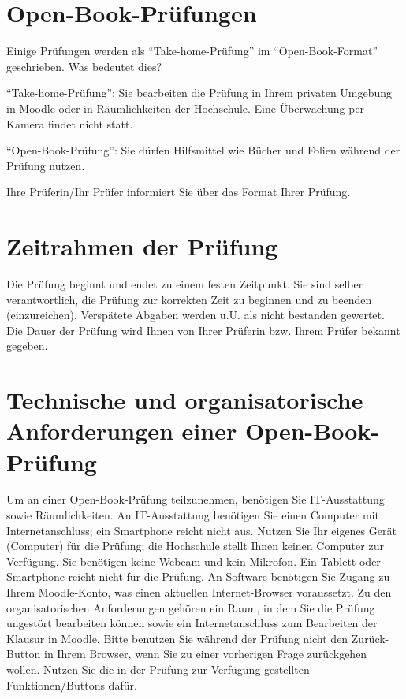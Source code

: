 \documentclass[
  a4paper,
  DIV=11]{scrreprt}
\theoremstyle{definition}
\theoremstyle{remark}
\begin{document}
\hypertarget{open-book-pruxfcfungen}{%
\section{Open-Book-Prüfungen}\label{open-book-pruxfcfungen}}

Einige Prüfungen werden als ``Take-home-Prüfung'' im
``Open-Book-Format'' geschrieben. Was bedeutet dies?

``Take-home-Prüfung'': Sie bearbeiten die Prüfung in Ihrem privaten
Umgebung in Moodle oder in Räumlichkeiten der Hochschule. Eine
Überwachung per Kamera findet nicht statt.

``Open-Book-Prüfung'': Sie dürfen Hilfsmittel wie Bücher und Folien
während der Prüfung nutzen.

Ihre Prüferin/Ihr Prüfer informiert Sie über das Format Ihrer Prüfung.

\hypertarget{zeitrahmen-der-pruxfcfung}{%
\section{Zeitrahmen der Prüfung}\label{zeitrahmen-der-pruxfcfung}}

Die Prüfung beginnt und endet zu einem festen Zeitpunkt. Sie sind selber
verantwortlich, die Prüfung zur korrekten Zeit zu beginnen und zu
beenden (einzureichen). Verspätete Abgaben werden u.U. als nicht
bestanden gewertet. Die Dauer der Prüfung wird Ihnen von Ihrer Prüferin
bzw. Ihrem Prüfer bekannt gegeben.

\hypertarget{technische-und-organisatorische-anforderungen-einer-open-book-pruxfcfung}{%
\section{Technische und organisatorische Anforderungen einer
Open-Book-Prüfung}\label{technische-und-organisatorische-anforderungen-einer-open-book-pruxfcfung}}

Um an einer Open-Book-Prüfung teilzunehmen, benötigen Sie IT-Ausstattung
sowie Räumlichkeiten. An IT-Ausstattung benötigen Sie einen Computer mit
Internetanschluss; ein Smartphone reicht nicht aus. Nutzen Sie Ihr
eigenes Gerät (Computer) für die Prüfung; die Hochschule stellt Ihnen
keinen Computer zur Verfügung. Sie benötigen keine Webcam und kein
Mikrofon. Ein Tablett oder Smartphone reicht nicht für die Prüfung. An
Software benötigen Sie Zugang zu Ihrem Moodle-Konto, was einen aktuellen
Internet-Browser voraussetzt. Zu den organisatorischen Anforderungen
gehören ein Raum, in dem Sie die Prüfung ungestört bearbeiten können
sowie ein Internetanschluss zum Bearbeiten der Klausur in Moodle. Bitte
benutzen Sie während der Prüfung nicht den Zurück-Button in Ihrem
Browser, wenn Sie zu einer vorherigen Frage zurückgehen wollen. Nutzen
Sie die in der Prüfung zur Verfügung gestellten Funktionen/Buttons
dafür.
\end{document}
